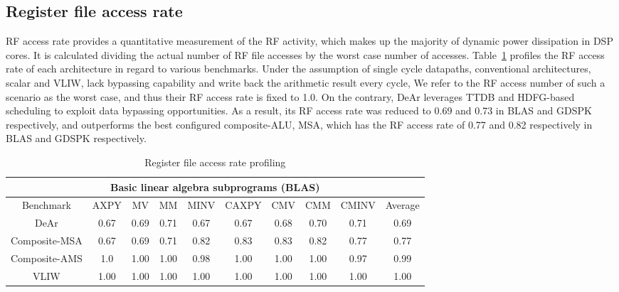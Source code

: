 {    \subsection{Register file access rate}
    RF access rate provides a quantitative measurement of the RF activity, 
    which makes up the majority of dynamic power dissipation in DSP cores.
    It is calculated dividing the actual number of RF file accesses by the worst case number of accesses.
    Table~\ref{tab:rpd} profiles the RF access rate of each architecture in regard to various benchmarks.
    Under the assumption of single cycle datapaths, conventional architectures, scalar and VLIW, 
    lack bypassing capability and write back the arithmetic result every cycle, 
    We refer to the RF access number of such a scenario as the worst case, 
    and thus their RF access rate is fixed to 1.0.
    On the contrary, DeAr leverages TTDB and HDFG-based scheduling to exploit data bypassing opportunities. 
    As a result, its RF access rate was reduced to 0.69 and 0.73 in BLAS and GDSPK respectively, 
    and outperforms the best configured composite-ALU, MSA, which has the RF access rate of 0.77 and 0.82 respectively in BLAS and GDSPK respectively.
    \begin{table}[!ht]
        \centering
        \caption{Register file access rate profiling}
        \label{tab:rpd}
        \resizebox{\columnwidth}{!}
        {
            \begin{tabular}{|c|c|c|c|c|c|c|c|c|c|}
                \hline
                \multicolumn{10}{|c|}{\textbf{Basic linear algebra subprograms (BLAS)}} \\ \hline
                Benchmark  &  AXPY  &  MV  &  MM  &  MINV  &  CAXPY  &  CMV  &  CMM  &  CMINV  &  Average \\ \hline 
                DeAr  &   0.67  &   0.69  &   0.71  &   0.67  &   0.67  &   0.68  &   0.70  &   0.71  &   0.69     \\ \hline
                Composite-MSA  &   0.67  &   0.69  &  0.71  &   0.82  &   0.83  &   0.83  &   0.82  &   0.77  &  0.77     \\ \hline 
                Composite-AMS  &   1.0  &   1.00  &   1.00  &   0.98  &   1.00  &   1.00  &   1.00  &   0.97  &   0.99     \\ \hline 
                VLIW  &   1.00  &   1.00  &   1.00  &   1.00  &   1.00  &   1.00  &   1.00  &   1.00  &   1.00     \\ \hline 

\end{tabular}}
\end{table}}
